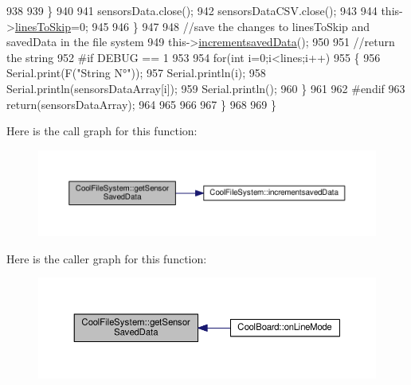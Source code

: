 \begin{DoxyCode}
938 
939             \}
940 
941             sensorsData.close();
942             sensorsDataCSV.close();
943             
944             this->\hyperlink{class_cool_file_system_a84fdb6057e534b395512463daa28ea3c}{linesToSkip}=0;
945         
946         \}
947 
948         \textcolor{comment}{//save the changes to linesToSkip and savedData in the file system}
949         this->\hyperlink{class_cool_file_system_aae045125288f255f3e258073dcada2a6}{incrementsavedData}();
950 
951         \textcolor{comment}{//return the string}
952 \textcolor{preprocessor}{        #if DEBUG == 1}
953         
954             \textcolor{keywordflow}{for}(\textcolor{keywordtype}{int} i=0;i<lines;i++)
955             \{
956                 Serial.print(F(\textcolor{stringliteral}{"String N°"}));
957                 Serial.println(i);
958                 Serial.println(sensorsDataArray[i]);
959                 Serial.println();           
960             \}
961     
962 \textcolor{preprocessor}{        #endif}
963         \textcolor{keywordflow}{return}(sensorsDataArray);
964         
965         
966         
967     \}
968 
969 \}
\end{DoxyCode}
Here is the call graph for this function\+:\nopagebreak
\begin{figure}[H]
\begin{center}
\leavevmode
\includegraphics[width=350pt]{db/d0c/class_cool_file_system_a3223ffff4266a6300988fab956d6b4b2_cgraph}
\end{center}
\end{figure}
Here is the caller graph for this function\+:\nopagebreak
\begin{figure}[H]
\begin{center}
\leavevmode
\includegraphics[width=350pt]{db/d0c/class_cool_file_system_a3223ffff4266a6300988fab956d6b4b2_icgraph}
\end{center}
\end{figure}
\mbox{\label{class_cool_file_system_aae045125288f255f3e258073dcada2a6}} 
